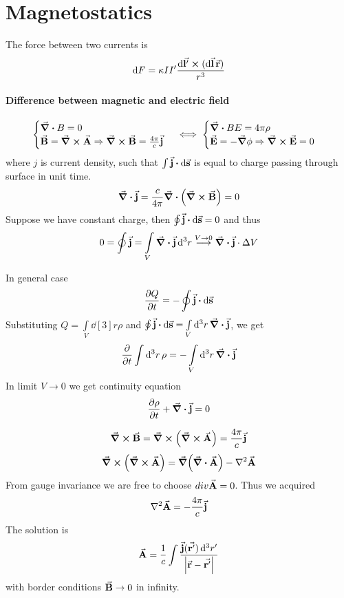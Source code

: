 \section{Magnetostatics}
The force between two currents is
$$\dd{F} = \kappa II' \frac{\dd{\va{l'}} \cross (\dd{\va{l}} \va{r})}{r^3}$$

\paragraph{Difference between magnetic and electric field}
$$\begin{cases}
\div{B}  = 0 \\
\va{B} = \curl{\va{A}} \Rightarrow \curl{\va{B}} = \frac{4\pi}{c} \va{j} 
\end{cases} \iff \begin{cases}
\div{BE}  = 4\pi \rho \\
\va{E} = -\grad{\phi} \Rightarrow \curl{\va{E}} = 0
\end{cases}$$
where $j$ is current density, such that $\int \va{j} \vdot \dd{\va{s}}$ is equal to charge passing through surface in unit time.
$$\div{\va{j}} = \frac{c}{4\pi} \div(\curl{\va{B}}) = 0$$
Suppose we have constant charge, then $\oint \va{j} \vdot \dd{\va{s}} = 0$ and thus
$$0=\oint \va{j} = \int\limits_{V} \div{\va{j}} \dd[3]{r} \stackrel{V \to 0}{\longrightarrow} \div{\va{j}} \cdot \Delta V $$

In general case
$$\pdv{Q}{t} = - \oint \va{j}\vdot \dd{\va{s}}$$
Substituting $Q = \int\limits_V  \dd[3]{r} \rho$ and $ \oint \va{j}\vdot \dd{\va{s}} = \int\limits_V \dd[3]{r} \div{\va{j}} $, we get
$$\pdv{t} \int \dd[3]{r} \rho = -\int\limits_V \dd[3]{r}  \div{\va{j}} $$
In limit $V \to 0$ we get continuity equation
$$\pdv{\rho}{t} + \div{\va{j}} = 0$$

$$\curl{\va{B}} = \curl(\curl{\va{A}}) = \frac{4\pi}{c} \va{j}$$
$$\curl(\curl{\va{A}}) = \grad(\div{\va{A}}) - \laplacian{\va{A}}$$
From gauge invariance we are free to choose $div{\va{A}} = 0$. Thus we acquired
$$\laplacian{\va{A}} = - \frac{4\pi}{c} \va{j}$$
The solution is 
$$\va{A} = \frac{1}{c} \int \frac{\va{j} (\va{r'}) \dd[3]{r'}}{\qty|\va{r} -\va{r'}|}$$
with border conditions $\va{B} \to 0$ in infinity.